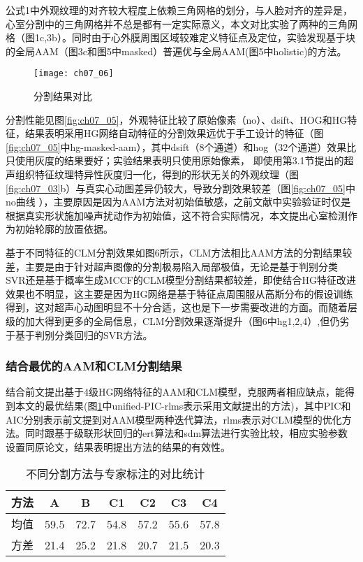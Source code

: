公式1中外观纹理的对齐较大程度上依赖三角网格的划分，与人脸对齐的差异是，心室分割中的三角网格并不总是都有一定实际意义，本文对比实验了两种的三角网格（图1c,3b）。同时由于心外膜周围区域较难定义特征点及定位，实验发现基于块的全局AAM（图3c和图5中masked）普遍优与全局AAM(图5中holistic)的方法。
\begin{figure}[!htbp]
\centering
\texttt{[image: ch07\_06]}
\caption{分割结果对比}
\label{fig:ch07_06}
\end{figure}  
 
 
分割性能见图\ref{fig:ch07_05}，外观特征比较了原始像素（no）、dsift\citep{Lowe2004}、HOG和HG特征，结果表明采用HG网络自动特征的分割效果远优于手工设计的特征（图\ref{fig:ch07_05}中hg-masked-aam），其中dsift（8个通道）和hog（32个通道）效果比只使用灰度的结果要好；实验结果表明只使用原始像素，
即使用第3.1节提出的超声组织特征纹理特异性灰度归一化，得到的形状无关的外观纹理（图\ref{fig:ch07_03}b）与真实心动图差异仍较大，导致分割效果较差（图\ref{fig:ch07_05}中no曲线 ），主要原因是因为AAM方法对初始值敏感，之前文献\citep{Bosch2002,Hansson2014}中实验验证时仅是根据真实形状施加噪声扰动作为初始值\citep{jixianghu-2016}，这不符合实际情况，本文提出心室检测作为初始轮廓的放置依据。

基于不同特征的CLM分割效果如图6所示，CLM方法相比AAM方法的分割结果较差，主要是由于针对超声图像的分割极易陷入局部极值，无论是基于判别分类SVR还是基于概率生成MCCF的CLM模型分割结果都较差，即使结合HG特征改进效果也不明显，这主要是因为HG网络是基于特征点周围服从高斯分布的假设训练得到，这对超声心动图明显不十分合适，这也是下一步需要改进的方面。而随着层级的加大得到更多的全局信息，CLM分割效果逐渐提升（图6中hg1,2,4）,但仍劣于基于判别分类回归的SVR方法。
\subsubsection{结合最优的AAM和CLM分割结果}
结合前文提出基于4级HG网络特征的AAM和CLM模型，克服两者相应缺点，能得到本文的最优结果(图\ref{fig:ch07_06}中unified-PIC-rlms表示采用文献\citep{Jan2017}提出的方法)，其中PIC和AIC分别表示前文提到对AAM模型两种迭代算法，rlms表示对CLM模型的优化方法。同时跟基于级联形状回归的ert算法\citep{Kazemi2014a}和sdm算法\citep{Xiong2013}进行实验比较，相应实验参数设置同原论文，结果表明提出方法的结果的有效性。

\begin{table}[!htbp]
    \centering
    \footnotesize%
    \setlength{\tabcolsep}{4pt}%
    \renewcommand{\arraystretch}{1.2}%
    \begin{tabular}{lcccccc}
        \cline{1-7}%
         方法  &A  &B &C1 &C2	&C3	&C4 \\
        \hline
        均值	&59.5	&72.7	&54.8	&57.2	&55.6	&57.8 \\
        \hline
        方差	&21.4	&25.2	&21.8	&20.7	&21.5	&20.3\\
        \hline\hline
    \end{tabular}
    \caption{不同分割方法与专家标注的对比统计}
    \label{tab:ch07_01}
\end{table}

